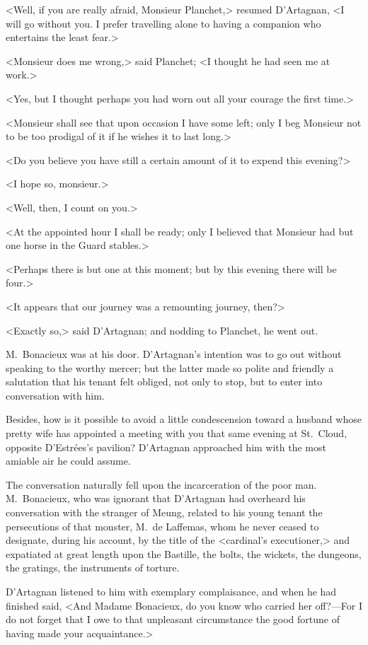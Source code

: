 <Well, if you are really afraid, Monsieur Planchet,> resumed D'Artagnan, <I will go without you. I prefer travelling alone to having a companion who entertains the least fear.> 

<Monsieur does me wrong,> said Planchet; <I thought he had seen me at work.> 

<Yes, but I thought perhaps you had worn out all your courage the first time.> 

<Monsieur shall see that upon occasion I have some left; only I beg Monsieur not to be too prodigal of it if he wishes it to last long.> 

<Do you believe you have still a certain amount of it to expend this evening?> 

<I hope so, monsieur.> 

<Well, then, I count on you.> 

<At the appointed hour I shall be ready; only I believed that Monsieur had but one horse in the Guard stables.> 

<Perhaps there is but one at this moment; but by this evening there will be four.> 

<It appears that our journey was a remounting journey, then?> 

<Exactly so,> said D'Artagnan; and nodding to Planchet, he went out. 

M.~Bonacieux was at his door. D'Artagnan's intention was to go out without speaking to the worthy mercer; but the latter made so polite and friendly a salutation that his tenant felt obliged, not only to stop, but to enter into conversation with him. 

Besides, how is it possible to avoid a little condescension toward a husband whose pretty wife has appointed a meeting with you that same evening at St.~Cloud, opposite D'Estrées's pavilion? D'Artagnan approached him with the most amiable air he could assume. 

The conversation naturally fell upon the incarceration of the poor man. M.~Bonacieux, who was ignorant that D'Artagnan had overheard his conversation with the stranger of Meung, related to his young tenant the persecutions of that monster, M.~de Laffemas, whom he never ceased to designate, during his account, by the title of the <cardinal's executioner,> and expatiated at great length upon the Bastille, the bolts, the wickets, the dungeons, the gratings, the instruments of torture. 

D'Artagnan listened to him with exemplary complaisance, and when he had finished said, <And Madame Bonacieux, do you know who carried her off?—For I do not forget that I owe to that unpleasant circumstance the good fortune of having made your acquaintance.> 

